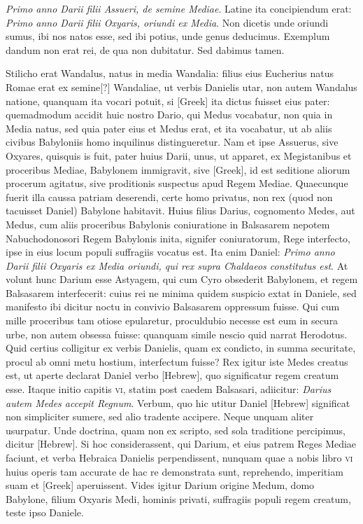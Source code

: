 \begin{parnumbers}
\textit{Primo anno Darii filii Assueri, de semine
Mediae}.
\lnr{}Latine ita concipiendum erat: \textit{Primo anno Darii filii Oxyaris,
oriundi ex Media}.
\lnr{}Non dicetis unde oriundi sumus, ibi nos natos
esse, sed ibi potius, unde genus deducimus.
\lnr{}Exemplum dandum
non erat rei, de qua non dubitatur.
\lnr{}Sed dabimus tamen.

{}
\lnr{}Stilicho
erat Wandalus, natus in media Wandalia: filius eius Eucherius natus
Romae erat ex semine[?] Wandaliae, ut verbis Danielis utar, non autem
Wandalus natione, quanquam ita vocari potuit, si \textgreek{[Greek]}
ita dictus fuisset eius pater: quemadmodum accidit huic nostro
Dario, qui Medus vocabatur, non quia in Media natus, sed
quia pater eius et Medus erat, et ita vocabatur, ut ab aliis civibus
Babyloniis homo inquilinus distingueretur.
\lnr{}Nam et ipse Assuerus,
sive Oxyares, quisquis is fuit, pater huius Darii, unus, ut apparet,
ex Megistanibus et proceribus Mediae, Babylonem immigravit,
sive \textgreek{[Greek]}, id est seditione aliorum procerum agitatus,
sive proditionis suspectus apud Regem Mediae.
\lnr{}Quaecunque fuerit
illa caussa patriam deserendi, certe homo privatus, non rex
(quod non tacuisset Daniel) Babylone habitavit.
\lnr{}Huius filius Darius,
cognomento Medes, aut Medus, cum aliis proceribus Babylonis
coniuratione in Balsasarem nepotem Nabuchodonosori Regem
Babylonis inita, signifer coniuratorum, Rege interfecto, ipse
in eius locum populi suffragiis vocatus est.
\lnr{}Ita enim Daniel: \textit{Primo
anno Darii filii Oxyaris ex Media oriundi, qui rex supra Chaldaeos
constitutus est}.
\lnr{}At volunt hunc Darium esse Astyagem, qui cum
Cyro obsederit Babylonem, et regem Balsasarem interfecerit: cuius
rei ne minima quidem suspicio extat in Daniele, sed manifesto
ibi dicitur noctu in convivio Balsasarem oppressum fuisse.
\lnr{}Qui
cum mille proceribus tam otiose epularetur, proculdubio necesse
est eum in secura urbe, non autem obsessa fuisse: quanquam simile
nescio quid narrat Herodotus.
\lnr{}Quid certius colligitur ex verbis
Danielis, quam ex condicto, in summa securitate, procul ab omni
metu hostium, interfectum fuisse?
\lnr{}Rex igitur iste Medes creatus
est, ut aperte declarat Daniel verbo
 \texthebrew{[Hebrew]}, quo significatur regem
creatum esse.
\lnr{}Itaque initio capitis \textsc{vi}, statim post caedem Balsasari,
adiicitur: \textit{Darius autem Medes accepit Regnum}.
\lnr{}Verbum,
quo hic utitur Daniel \texthebrew{[Hebrew]}
 significat non simpliciter sumere, sed
alio tradente accipere.
\lnr{}Neque unquam aliter usurpatur.
\lnr{}Unde doctrina,
quam non ex scripto, sed sola traditione percipimus, dicitur
\texthebrew{[Hebrew]}.
\lnr{}Si hoc considerassent, qui Darium, et eius patrem Reges
Mediae faciunt, et verba Hebraica Danielis perpendissent,
nunquam quae a nobis libro \textsc{vi} huius operis tam accurate de hac
re demonstrata sunt, reprehendo, imperitiam suam et \textgreek{[Greek]}
aperuissent.
\lnr{}Vides igitur Darium origine Medum, domo Babylone,
filium Oxyaris Medi, hominis privati, suffragiis populi regem
creatum, teste ipso Daniele.


\end{parnumbers}
